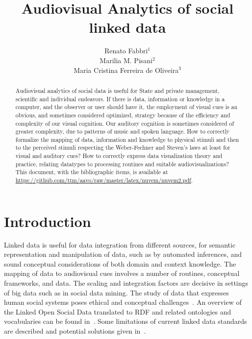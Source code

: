 \documentclass[letterpaper,10pt]{article}
\begin{document}
\title{Audiovisual Analytics of social linked data}

\author{Renato Fabbri$^1$\\
	Marilia M. Pisani$^2$\\
	Maria Cristina Ferreira de Oliveira$^3$
}
\address{$^{1,3}$IFSC/USP, $^2$CCNH/UFABC}

\begin{abstract}
	Audiovisual analytics of social data is useful for State and private
	management, scientific and individual endeavors.
	If there is data, information or knowledge in a computer,
	and the observer or user should have it, the employment of visual cues is an obvious,
	and sometimes considered optimized, strategy because of the efficiency and
	complexity of our visual cognition.
	Our auditory cognition is sometimes considered of greater complexity,
	due to patterns of music and spoken language.
	How to correctly formalize the mapping of data, information
	and knowledge to physical stimuli
	and then to the perceived stimuli
	respecting the Weber-Fechner and Steven's laws at least for visual
	and auditory cues?
	How to correctly express data visualization theory and practice,
	relating datatypes to processing routines and suitable audiovisualizations?
  This document, with the bibliographic items, is available at
  \url{https://github.com/ttm/aavo/raw/master/latex/nuvem/nuvem2.pdf}.
\end{abstract}

\section{Introduction}
Linked data is useful for data integration from different sources,
for semantic representation and manipulation of data,
such as by automated inferences,
and sound conceptual considerations of both domain and context
knowledge.
The mapping of data to audiovisual cues
involves a number of routines, conceptual frameworks,
and data.
The scaling and integration factors are decisive in settings
of big data such as in social data mining.
The study of data that expresses human social systems
poses ethical and conceptual challenges~\cite{an,an2}.
An overview of the Linked Open Social Data translated to
RDF and related ontologies and vocabularies
can be found in~\cite{nuvem1,tese,losd}.
Some limitations of current linked data standards
are described and potential solutions given in~\cite{ont}.
\end{document}

